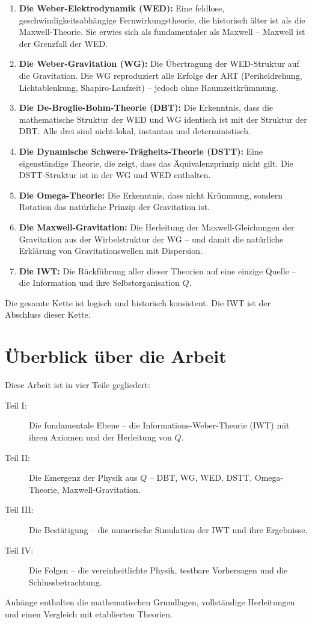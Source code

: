 \begin{enumerate}
\item \textbf{Die Weber-Elektrodynamik (WED):} Eine feldlose, geschwindigkeitsabhängige Fernwirkungstheorie, die historisch älter ist als die Maxwell-Theorie. Sie erwies sich als fundamentaler als Maxwell – Maxwell ist der Grenzfall der WED.

\item \textbf{Die Weber-Gravitation (WG):} Die Übertragung der WED-Struktur auf die Gravitation. Die WG reproduziert alle Erfolge der ART (Periheldrehung, Lichtablenkung, Shapiro-Laufzeit) – jedoch ohne Raumzeitkrümmung.

\item \textbf{Die De-Broglie-Bohm-Theorie (DBT):} Die Erkenntnis, dass die mathematische Struktur der WED und WG identisch ist mit der Struktur der DBT. Alle drei sind nicht-lokal, instantan und deterministisch.

\item \textbf{Die Dynamische Schwere-Trägheits-Theorie (DSTT):} Eine eigenständige Theorie, die zeigt, dass das Äquivalenzprinzip nicht gilt. Die DSTT-Struktur ist in der WG und WED enthalten.

\item \textbf{Die Omega-Theorie:} Die Erkenntnis, dass nicht Krümmung, sondern Rotation das natürliche Prinzip der Gravitation ist.

\item \textbf{Die Maxwell-Gravitation:} Die Herleitung der Maxwell-Gleichungen der Gravitation aus der Wirbelstruktur der WG – und damit die natürliche Erklärung von Gravitationswellen mit Dispersion.

\item \textbf{Die IWT:} Die Rückführung aller dieser Theorien auf eine einzige Quelle – die Information und ihre Selbstorganisation \( Q \).
\end{enumerate}

Die gesamte Kette ist logisch und historisch konsistent. Die IWT ist der Abschluss dieser Kette.

\section{Überblick über die Arbeit}

Diese Arbeit ist in vier Teile gegliedert:

\begin{description}
\item[Teil I:] Die fundamentale Ebene – die Informations-Weber-Theorie (IWT) mit ihren Axiomen und der Herleitung von \( Q \).
\item[Teil II:] Die Emergenz der Physik aus \( Q \) – DBT, WG, WED, DSTT, Omega-Theorie, Maxwell-Gravitation.
\item[Teil III:] Die Bestätigung – die numerische Simulation der IWT und ihre Ergebnisse.
\item[Teil IV:] Die Folgen – die vereinheitlichte Physik, testbare Vorhersagen und die Schlussbetrachtung.
\end{description}

Anhänge enthalten die mathematischen Grundlagen, vollständige Herleitungen und einen Vergleich mit etablierten Theorien.
